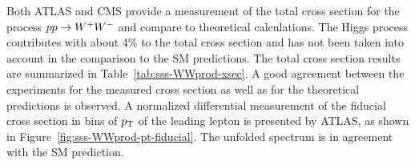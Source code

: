 
Both ATLAS and CMS provide a measurement of the total cross section for the process $pp \rightarrow W^+W^-$
and compare to theoretical calculations. The Higgs process contributes with about 4\% to the total 
cross section and has not been taken into account in the comparison to the SM predictions.
The total cross section results are summarized in Table~\ref{tab:sss-WWprod-xsec}.
A good agreement between the experiments for the measured cross section as well as for the theoretical predictions
is observed.
A normalized differential measurement of the fiducial cross section in bins of $p_{\mathrm{T}}$ of the leading lepton is presented by ATLAS,
as shown in Figure~\ref{fig:sss-WWprod-pt-fiducial}. The unfolded spectrum is in agreement with the SM prediction.

\begin{table}[htp]

\begin{center}
\caption{Summary of measured fiducial and total $\WW$ production cross sections from ATLAS and CMS 
at 7 and 8 TeV center-of-mass energies in the $\lnu\lnu$ final state.}
\end{center}
\label{tab:sss-WWprod-xsec}
\end{table}%

